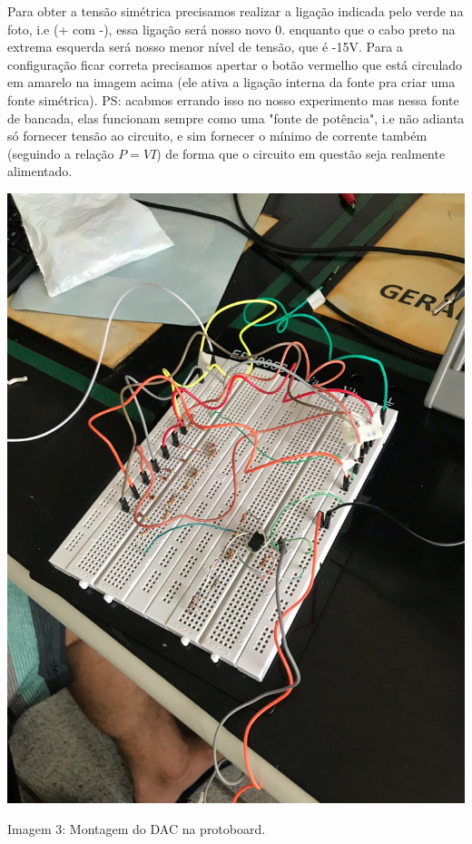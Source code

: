 \documentclass{article}
\begin{document}
Para obter a tensão simétrica precisamos realizar a ligação indicada pelo verde na foto, i.e (+ com -), essa ligação será nosso novo 0. enquanto que o cabo preto na extrema esquerda será nosso menor nível de tensão, que é -15V. Para a configuração ficar correta precisamos apertar o botão vermelho que está circulado em amarelo na imagem acima (ele ativa a ligação interna da fonte pra criar uma fonte simétrica). PS: acabmos errando isso no nosso experimento mas nessa fonte de bancada, elas funcionam sempre como uma "fonte de potência", i.e não adianta só fornecer tensão ao circuito, e sim fornecer o mínimo de corrente também (seguindo a relação $P=VI$) de forma que o circuito em questão seja realmente alimentado.

\begin{center}
    \includegraphics[scale=0.2]{images/montagem_dac.jpeg}
    
    Imagem 3: Montagem do DAC na protoboard.
\end{center}
\end{document}
